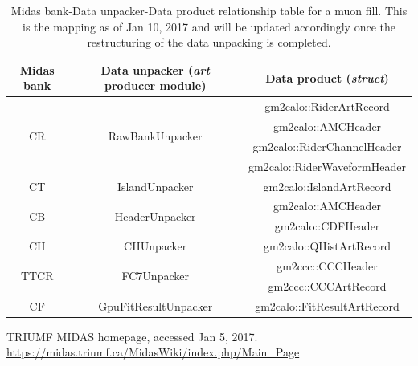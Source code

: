 \begin{table}[htbp]
\centering
\caption{Midas bank-Data unpacker-Data product relationship table for a muon fill. This is the mapping as of Jan 10, 2017 and will be updated accordingly once the restructuring of the data unpacking is completed.}
\begin{tabular}{|c|c|c|}
\hline
Midas bank & Data unpacker (\textit{art} producer module) & Data product (\textit{struct}) \\
\hline
\multirow{4}{*}{CR} & \multirow{4}{*}{RawBankUnpacker} & gm2calo::RiderArtRecord \\
& & gm2calo::AMCHeader \\
& & gm2calo::RiderChannelHeader \\
& & gm2calo::RiderWaveformHeader \\
\hline
CT & IslandUnpacker & gm2calo::IslandArtRecord \\
\hline
\multirow{2}{*}{CB} & \multirow{2}{*}{HeaderUnpacker} & gm2calo::AMCHeader \\
\cline{3-3}
& & gm2calo::CDFHeader \\
\hline
CH & CHUnpacker & gm2calo::QHistArtRecord \\
\hline
\multirow{2}{*}{TTCR} & \multirow{2}{*}{FC7Unpacker} & gm2ccc::CCCHeader \\
\cline{3-3}
& & gm2ccc::CCCArtRecord \\
\hline
CF & GpuFitResultUnpacker & gm2calo::FitResultArtRecord \\
\hline
\end{tabular} 
\label{tab:cheatsheet}
\end{table}


\begin{thebibliography}{9}
TRIUMF MIDAS homepage, accessed Jan 5, 2017. 
\url{https://midas.triumf.ca/MidasWiki/index.php/Main_Page}

\end{thebibliography}


